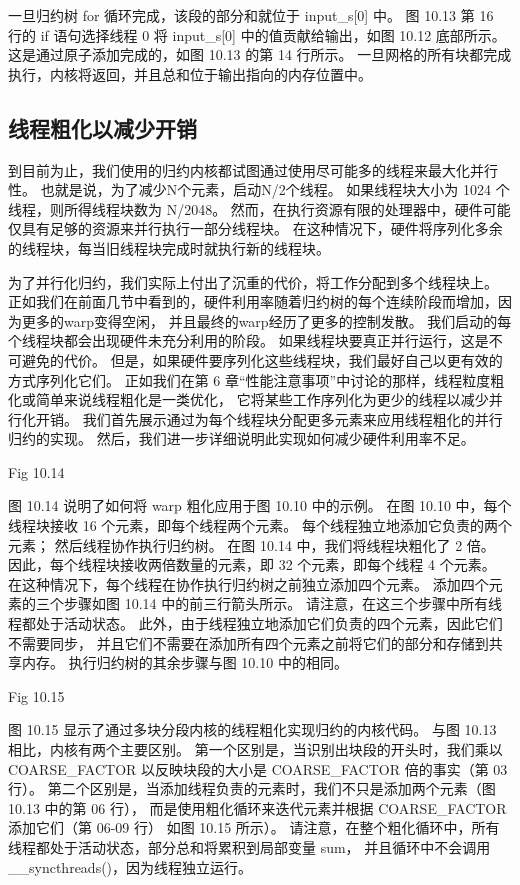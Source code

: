 一旦归约树 for 循环完成，该段的部分和就位于 input\_s[0] 中。 
图 10.13 第 16 行的 if 语句选择线程 0 将 input\_s[0] 中的值贡献给输出，如图 10.12 底部所示。 
这是通过原子添加完成的，如图 10.13 的第 14 行所示。 
一旦网格的所有块都完成执行，内核将返回，并且总和位于输出指向的内存位置中。

\subsection{线程粗化以减少开销}
到目前为止，我们使用的归约内核都试图通过使用尽可能多的线程来最大化并行性。 
也就是说，为了减少N个元素，启动N/2个线程。 如果线程块大小为 1024 个线程，则所得线程块数为 N/2048。 
然而，在执行资源有限的处理器中，硬件可能仅具有足够的资源来并行执行一部分线程块。 
在这种情况下，硬件将序列化多余的线程块，每当旧线程块完成时就执行新的线程块。

为了并行化归约，我们实际上付出了沉重的代价，将工作分配到多个线程块上。 
正如我们在前面几节中看到的，硬件利用率随着归约树的每个连续阶段而增加，因为更多的warp变得空闲，
并且最终的warp经历了更多的控制发散。 我们启动的每个线程块都会出现硬件未充分利用的阶段。 
如果线程块要真正并行运行，这是不可避免的代价。 但是，如果硬件要序列化这些线程块，我们最好自己以更有效的方式序列化它们。 
正如我们在第 6 章“性能注意事项”中讨论的那样，线程粒度粗化或简单来说线程粗化是一类优化，
它将某些工作序列化为更少的线程以减少并行化开销。 我们首先展示通过为每个线程块分配更多元素来应用线程粗化的并行归约的实现。 
然后，我们进一步详细说明此实现如何减少硬件利用率不足。

{\color{red} Fig 10.14}

图 10.14 说明了如何将 warp 粗化应用于图 10.10 中的示例。 在图 10.10 中，每个线程块接收 16 个元素，即每个线程两个元素。 
每个线程独立地添加它负责的两个元素； 然后线程协作执行归约树。 在图 10.14 中，我们将线程块粗化了 2 倍。
因此，每个线程块接收两倍数量的元素，即 32 个元素，即每个线程 4 个元素。 
在这种情况下，每个线程在协作执行归约树之前独立添加四个元素。 添加四个元素的三个步骤如图 10.14 中的前三行箭头所示。 
请注意，在这三个步骤中所有线程都处于活动状态。 
此外，由于线程独立地添加它们负责的四个元素，因此它们不需要同步，
并且它们不需要在添加所有四个元素之前将它们的部分和存储到共享内存。 执行归约树的其余步骤与图 10.10 中的相同。

{\color{red} Fig 10.15}

图 10.15 显示了通过多块分段内核的线程粗化实现归约的内核代码。 与图 10.13 相比，内核有两个主要区别。 
第一个区别是，当识别出块段的开头时，我们乘以 COARSE\_FACTOR 以反映块段的大小是 COARSE\_FACTOR 倍的事实（第 03 行）。 
第二个区别是，当添加线程负责的元素时，我们不只是添加两个元素（图 10.13 中的第 06 行），
而是使用粗化循环来迭代元素并根据 COARSE\_FACTOR 添加它们（第 06-09 行） 如图 10.15 所示）。 
请注意，在整个粗化循环中，所有线程都处于活动状态，部分总和将累积到局部变量 sum，
并且循环中不会调用 \_\_syncthreads()，因为线程独立运行。

